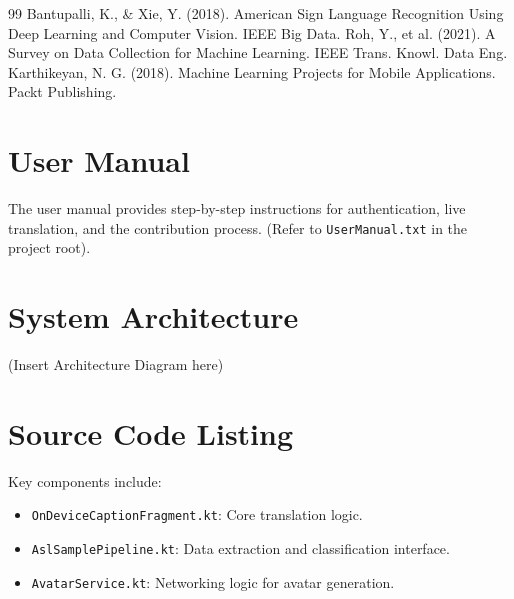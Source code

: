 \documentclass[12pt,a4paper]{article}
\begin{document}
\begin{thebibliography}{99}
     Bantupalli, K., \& Xie, Y. (2018). American Sign Language Recognition Using Deep Learning and Computer Vision. IEEE Big Data.
     Roh, Y., et al. (2021). A Survey on Data Collection for Machine Learning. IEEE Trans. Knowl. Data Eng.
     Karthikeyan, N. G. (2018). Machine Learning Projects for Mobile Applications. Packt Publishing.
\end{thebibliography}

\newpage
\appendix
\section{User Manual}
The user manual provides step-by-step instructions for authentication, live translation, and the contribution process. (Refer to \texttt{UserManual.txt} in the project root).

\section{System Architecture}
(Insert Architecture Diagram here)

\section{Source Code Listing}
Key components include:
\begin{itemize}
    \item \texttt{OnDeviceCaptionFragment.kt}: Core translation logic.
    \item \texttt{AslSamplePipeline.kt}: Data extraction and classification interface.
    \item \texttt{AvatarService.kt}: Networking logic for avatar generation.
\end{itemize}
\end{document}

